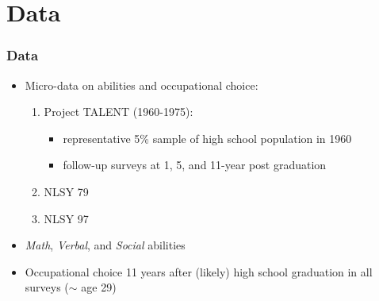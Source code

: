 \documentclass[11pt]{beamer}
\begin{document}
\section{Data}	
\begin{frame}
\frametitle{Data}
\begin{itemize}
	\item Micro-data on abilities and occupational choice:
	\begin{enumerate}
		\item Project TALENT (1960-1975):
		\begin{itemize}
			\item representative 5\% sample of high school population in 1960
			\item follow-up surveys at 1, 5, and 11-year post graduation
		\end{itemize}
		\item NLSY 79
		\item NLSY 97
	\end{enumerate}
	\item \textit{Math}, \textit{Verbal}, and \textit{Social} abilities
	\item Occupational choice 11 years after (likely) high school graduation in all surveys ($\sim$ age 29)
\end{itemize}
\end{frame}

\end{document}
